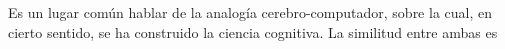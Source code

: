 \documentclass[a4paper, 12pt]{article}
\begin{document}
Es un lugar común hablar de la analogía cerebro-computador, sobre la cual, en
cierto sentido, se ha construido la ciencia cognitiva. La similitud entre ambas 
es 
\end{document}
